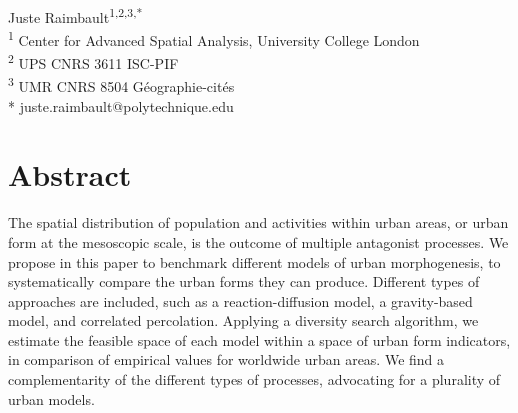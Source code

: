 \documentclass[10pt,letterpaper]{article}
\begin{document}
\vspace*{0.2in}

\begin{flushleft}
{\Large
\textbf{} %
}
\newline
\\
Juste Raimbault\textsuperscript{1,2,3,*}
\bigskip\\
\textsuperscript{1} Center for Advanced Spatial Analysis, University College London
\\
\textsuperscript{2} UPS CNRS 3611 ISC-PIF
\\
\textsuperscript{3} UMR CNRS 8504 G{\'e}ographie-cit{\'e}s
\bigskip\\
* juste.raimbault@polytechnique.edu



\end{flushleft}

\section*{Abstract}
\vspace{1cm}
The spatial distribution of population and activities within urban areas, or urban form at the mesoscopic scale, is the outcome of multiple antagonist processes. We propose in this paper to benchmark different models of urban morphogenesis, to systematically compare the urban forms they can produce. Different types of approaches are included, such as a reaction-diffusion model, a gravity-based model, and correlated percolation. Applying a diversity search algorithm, we estimate the feasible space of each model within a space of urban form indicators, in comparison of empirical values for worldwide urban areas. We find a complementarity of the different types of processes, advocating for a plurality of urban models.



\linenumbers
\end{document}
